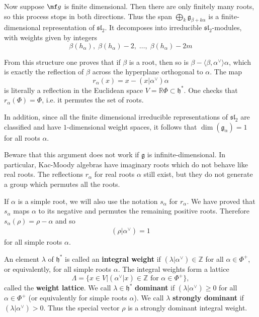 \documentclass[12pt]{article}
\begin{document}
\begin{remark}
    Now suppose $\mf g$ is finite dimensional. Then there are only finitely many roots, so this process stops in both directions. Thus the span $\bigoplus_{k} \mathfrak{g}_{\beta+k\alpha}$ is a finite-dimensional representation of $\mathfrak{sl}_2$. It decomposes into irreducible $\mathfrak{sl}_2$-modules, with weights given by integers \[\beta(h_\alpha),\;\beta(h_\alpha)-2,\;\dots,\;\beta(h_\alpha)-2m\]

    From this structure one proves that if $\beta$ is a root, then so is $\beta - \langle \beta,\alpha^\vee \rangle \alpha$, which is exactly the reflection of $\beta$ across the hyperplane orthogonal to $\alpha$. The map
    \[
        r_\alpha(x) = x - (x|\alpha^\vee)\alpha
    \]
    is literally a reflection in the Euclidean space $V = \mathbb{R}\Phi \subset \mathfrak{h}^*$.
    One checks that $r_\alpha(\Phi) = \Phi$, i.e. it permutes the set of roots.

    In addition, since all the finite dimensional irreducible representations of $\mathfrak{sl}_2$ are classified and have $1$-dimensional weight spaces, it follows that $\dim(\mathfrak{g}_\alpha) = 1$ for all roots $\alpha$.

    Beware that this argument does not work if $\mathfrak{g}$ is infinite-dimensional. In particular, Kac-Moody algebras have imaginary roots which do not behave like real roots. The reflections $r_\alpha$ for real roots $\alpha$ still exist, but they do not generate a group which permutes all the roots.

\end{remark}

If $\alpha$ is a simple root, we will also use the notation $s_\alpha$ for $r_\alpha$. We have proved that $s_\alpha$ maps $\alpha$ to its negative and permutes the remaining positive roots. Therefore $s_\alpha(\rho) = \rho - \alpha$ and so
\begin{align*}
    (\rho|\alpha^\vee) = 1
\end{align*}
for all simple roots $\alpha$.

An element $\lambda$ of $\mathfrak{h}^*$ is called an \textbf{integral weight} if $(\lambda|\alpha^\vee) \in \mathbb{Z}$ for all $\alpha \in \Phi^+$, or equivalently, for all simple roots $\alpha$. The integral weights form a lattice
\[
    \Lambda = \{x \in V | (\alpha^\vee|x) \in \mathbb{Z} \text{ for } \alpha \in \Phi^+ \},
\]
called the \textbf{weight lattice}. We call $\lambda \in \mathfrak{h}^*$ \textbf{dominant} if $(\lambda|\alpha^\vee) \geq 0$ for all $\alpha \in \Phi^+$ (or equivalently for simple roots $\alpha$). We call $\lambda$ \textbf{strongly dominant} if $(\lambda|\alpha^\vee) > 0$. Thus the special vector $\rho$ is a strongly dominant integral weight.
\end{document}
